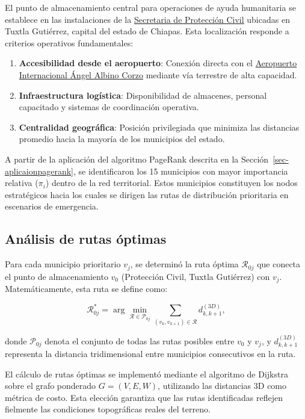 \documentclass[
  spanish,
  us-letterpaper,
]{scrreprt}
\providecommand{\tightlist}{%
  \setlength{\itemsep}{0pt}\setlength{\parskip}{0pt}}
\numberwithin{equation}{section}
\begin{document}
El punto de almacenamiento central para operaciones de ayuda humanitaria
se establece en las instalaciones de la
\href{https://maps.app.goo.gl/fRNWcaote5heu1Qp9}{Secretaria de
Protección Civil} ubicadas en Tuxtla Gutiérrez, capital del estado de
Chiapas. Esta localización responde a criterios operativos
fundamentales:

\begin{enumerate}
\def\labelenumi{\arabic{enumi}.}
\tightlist
\item
  \textbf{Accesibilidad desde el aeropuerto}: Conexión directa con el
  \href{https://maps.app.goo.gl/kip9Nrw984oCGX7ZA}{Aeropuerto
  Internacional Ángel Albino Corzo} mediante vía terrestre de alta
  capacidad.
\item
  \textbf{Infraestructura logística}: Disponibilidad de almacenes,
  personal capacitado y sistemas de coordinación operativa.
\item
  \textbf{Centralidad geográfica}: Posición privilegiada que minimiza
  las distancias promedio hacia la mayoría de los municipios del estado.
\end{enumerate}

A partir de la aplicación del algoritmo PageRank descrita en la
Sección~\ref{sec-aplicaionpagerank}, se identificaron los 15 municipios
con mayor importancia relativa (\(\pi_i\)) dentro de la red territorial.
Estos municipios constituyen los nodos estratégicos hacia los cuales se
dirigen las rutas de distribución prioritaria en escenarios de
emergencia.

\subsection{Análisis de rutas
óptimas}\label{anuxe1lisis-de-rutas-uxf3ptimas}

Para cada municipio prioritario \(v_j\), se determinó la ruta óptima
\(\mathcal{R}_{0j}\) que conecta el punto de almacenamiento \(v_0\)
(Protección Civil, Tuxtla Gutiérrez) con \(v_j\). Matemáticamente, esta
ruta se define como:

\[
\mathcal{R}_{0j}^* = \arg\min_{\mathcal{R} \in \mathcal{P}_{0j}} \sum_{(v_k,v_{k+1}) \in \mathcal{R}} d_{k,k+1}^{(3D)},
\]

donde \(\mathcal{P}_{0j}\) denota el conjunto de todas las rutas
posibles entre \(v_0\) y \(v_j\), y \(d_{k,k+1}^{(3D)}\) representa la
distancia tridimensional entre municipios consecutivos en la ruta.

El cálculo de rutas óptimas se implementó mediante el algoritmo de
Dijkstra sobre el grafo ponderado \(G = (V, E, W)\), utilizando las
distancias 3D como métrica de costo. Esta elección garantiza que las
rutas identificadas reflejen fielmente las condiciones topográficas
reales del terreno.
\end{document}
